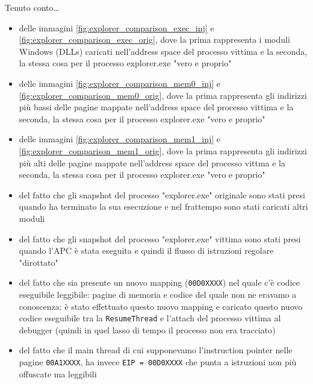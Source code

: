 \documentclass[
    a4paper, %
    11pt %
]{article}
\begin{document}
            Tenuto conto\dots 
            \begin{itemize}
                \item delle immagini \ref{fig:explorer_comparison_exec_inj} e
                    \ref{fig:explorer_comparison_exec_orig}, dove la prima rappresenta i moduli Windows (DLLs) 
                    caricati nell'address space del processo vittima e la seconda, la stessa cosa per il processo 
                    explorer.exe "vero e proprio"
                \item delle immagini \ref{fig:explorer_comparison_mem0_inj} e 
                    \ref{fig:explorer_comparison_mem0_orig}, dove la prima rappresenta gli indirizzi più bassi
                    delle pagine mappate nell'address space del processo vittima e la seconda, la stessa cosa per il
                    processo explorer.exe "vero e proprio"
                \item delle immagini \ref{fig:explorer_comparison_mem1_inj} e
                    \ref{fig:explorer_comparison_mem1_orig}, dove la prima rappresenta gli indirizzi più alti
                    delle pagine mappate nell'address space del processo vittma e la seconda, la stessa cosa per il
                    processo explorer.exe "vero e proprio"
                \item del fatto che gli snapshot del processo "explorer.exe" originale sono stati presi quando ha terminato la
                    sua esecuzione e nel frattempo sono stati caricati altri moduli
                \item del fatto che gli snapshot del processo "explorer.exe" vittima sono stati presi quando l'APC è stata          eseguita e quindi il flusso di istruzioni regolare "dirottato"
                \item del fatto che sia presente un nuovo mapping (\texttt{00D0XXXX}) nel quale c'è codice eseguibile leggibile:
                    pagine di memoria e codice del quale non ne eravamo a conoscenza: è stato effettuato questo nuovo mapping e caricato questo nuovo codice eseguibile tra la
                    \texttt{ResumeThread} e l'attach del processo vittima al debugger (quindi in quel lasso di tempo il processo non era tracciato)
                \item del fatto che il main thread di cui supponevamo l'instruction pointer nelle pagine
                    \texttt{00A1XXXX}, ha invece \texttt{EIP = 00D0XXXX} che punta a istruzioni non più offuscate
                    ma leggibili
            \end{itemize}
\end{document}
